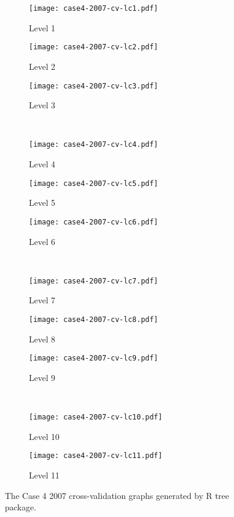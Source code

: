 \begin{appendices}
\begin{figure}[!ht] \centering
	\captionsetup[subfigure]{width=2.0in}
	\begin{subfigure}[t]{0.32\textwidth}
		\texttt{[image: case4-2007-cv-lc1.pdf]}
		\caption{Level 1}
	\end{subfigure}
	\begin{subfigure}[t]{0.32\textwidth}
		\texttt{[image: case4-2007-cv-lc2.pdf]}
		\caption{Level 2}
	\end{subfigure}
	\begin{subfigure}[t]{0.32\textwidth}
		\texttt{[image: case4-2007-cv-lc3.pdf]}
		\caption{Level 3}
	\end{subfigure}\\
	\vspace{5pt}
	\begin{subfigure}[t]{0.32\textwidth}
		\texttt{[image: case4-2007-cv-lc4.pdf]}
		\caption{Level 4}
	\end{subfigure}
	\begin{subfigure}[t]{0.32\textwidth}
		\texttt{[image: case4-2007-cv-lc5.pdf]}
		\caption{Level 5}
	\end{subfigure}
	\begin{subfigure}[t]{0.32\textwidth}
		\texttt{[image: case4-2007-cv-lc6.pdf]}
		\caption{Level 6}
	\end{subfigure}\\
	\vspace{5pt}	
	\begin{subfigure}[t]{0.32\textwidth}
		\texttt{[image: case4-2007-cv-lc7.pdf]}
		\caption{Level 7}
	\end{subfigure}
	\begin{subfigure}[t]{0.32\textwidth}
		\texttt{[image: case4-2007-cv-lc8.pdf]}
		\caption{Level 8}
	\end{subfigure}
	\begin{subfigure}[t]{0.32\textwidth}
		\texttt{[image: case4-2007-cv-lc9.pdf]}
		\caption{Level 9}
	\end{subfigure}\\
	\vspace{5pt}
	\begin{subfigure}[t]{0.32\textwidth}
		\texttt{[image: case4-2007-cv-lc10.pdf]}
		\caption{Level 10}
	\end{subfigure}
	\begin{subfigure}[t]{0.32\textwidth}
		\texttt{[image: case4-2007-cv-lc11.pdf]}
		\caption{Level 11}
	\end{subfigure}
	\vspace{5pt}
	\caption[The Case 4 2007 cross-validation graphs generated by R tree package.]{The Case 4 2007 cross-validation graphs generated by R tree package.}
	\label{fig: appendix-fig.c26.cv}
\end{figure}


\end{appendices}
